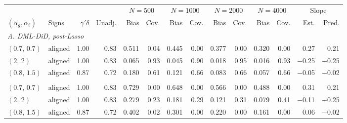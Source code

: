 \begin{tabular}{ll rr rr rr rr rr r r}
\toprule
 & & & & \multicolumn{2}{c}{$N=500$} & \multicolumn{2}{c}{$N=1000$} & \multicolumn{2}{c}{$N=2000$} & \multicolumn{2}{c}{$N=4000$} & \multicolumn{2}{c}{Slope} \\
\cmidrule(lr){5-6} \cmidrule(lr){7-8} \cmidrule(lr){9-10} \cmidrule(lr){11-12} \cmidrule(lr){13-14}
$(\alpha_g,\alpha_\ell)$ & Signs & $\gamma'\delta$ & Unadj. & Bias & Cov. & Bias & Cov. & Bias & Cov. & Bias & Cov. & Est. & Pred. \\
\midrule
\multicolumn{14}{l}{\emph{A. DML-DiD, post-Lasso}} \\
$(0.7,\,0.7)$ & aligned & 1.00 & 0.83 & 0.511 & 0.04 & 0.445 & 0.00 & 0.377 & 0.00 & 0.320 & 0.00 & 0.27 & 0.21 \\
$(2,\,2)$ & aligned & 1.00 & 0.83 & 0.065 & 0.93 & 0.045 & 0.90 & 0.018 & 0.95 & 0.016 & 0.93 & $-$0.25 & $-$0.25 \\
$(0.8,\,1.5)$ & aligned & 0.87 & 0.72 & 0.180 & 0.61 & 0.121 & 0.66 & 0.083 & 0.66 & 0.057 & 0.66 & $-$0.05 & $-$0.02 \\
\addlinespace
\multicolumn{14}{l}{\emph{B. DML-DiD, Lasso (no refit)}} \\
$(0.7,\,0.7)$ & aligned & 1.00 & 0.83 & 0.729 & 0.00 & 0.648 & 0.00 & 0.566 & 0.00 & 0.488 & 0.00 & 0.31 & 0.21 \\
$(2,\,2)$ & aligned & 1.00 & 0.83 & 0.279 & 0.23 & 0.181 & 0.29 & 0.121 & 0.31 & 0.079 & 0.41 & $-$0.11 & $-$0.25 \\
$(0.8,\,1.5)$ & aligned & 0.87 & 0.72 & 0.402 & 0.02 & 0.301 & 0.00 & 0.220 & 0.00 & 0.161 & 0.00 & 0.06 & $-$0.02 \\
\bottomrule
\end{tabular}
